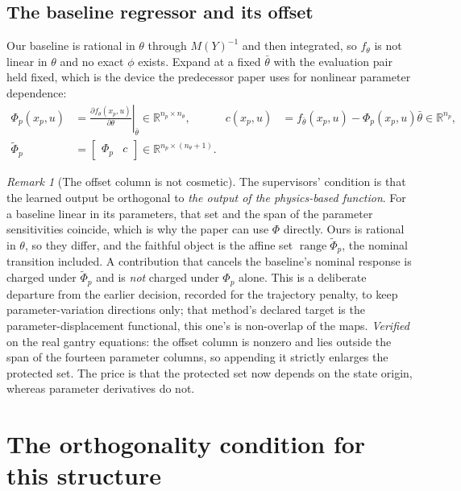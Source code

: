 \documentclass[11pt,a4paper]{article}
\newcommand{\R}{\mathbb R}
\newcommand{\ran}{\operatorname{range}}
\theoremstyle{remark}
\newtheorem{remark}[proposition]{Remark}
\begin{document}
\subsection{The baseline regressor and its offset}

Our baseline is rational in $\theta$ through $M(Y)^{-1}$ and then integrated, so $f_\theta$ is not
linear in $\theta$ and no exact $\phi$ exists. Expand at a fixed $\bar\theta$ with the evaluation
pair held fixed, which is the device the predecessor paper uses for nonlinear parameter dependence:
\begin{align}
 \Phi_p(x_p,u)&=\left.\frac{\partial f_\theta(x_p,u)}{\partial\theta}\right|_{\bar\theta}
   \in\R^{n_p\times n_\theta},
 &c(x_p,u)&=f_{\bar\theta}(x_p,u)-\Phi_p(x_p,u)\bar\theta\in\R^{n_p},\label{eq:taylor}\\
 \widetilde\Phi_p&=\begin{bmatrix}\Phi_p&c\end{bmatrix}\in\R^{n_p\times(n_\theta+1)}.
 &&\label{eq:extreg}
\end{align}

\begin{remark}[The offset column is not cosmetic]\label{rem:offset}
The supervisors' condition is that the learned output be orthogonal to \emph{the output of the
physics-based function}. For a baseline linear in its parameters, that set and the span of the
parameter sensitivities coincide, which is why the paper can use $\Phi$ directly. Ours is rational
in $\theta$, so they differ, and the faithful object is the affine set
$\ran\widetilde\Phi_p$, the nominal transition included. A contribution that cancels the
baseline's nominal response is charged under $\widetilde\Phi_p$ and is \emph{not} charged under
$\Phi_p$ alone. This is a deliberate departure from the earlier decision, recorded for the
trajectory penalty, to keep parameter-variation directions only; that method's declared target is
the parameter-displacement functional, this one's is non-overlap of the maps. \emph{Verified} on
the real gantry equations: the offset column is nonzero and lies outside the span of the fourteen
parameter columns, so appending it strictly enlarges the protected set. The price is that the
protected set now depends on the state origin, whereas parameter derivatives do not.
\end{remark}

\section{The orthogonality condition for this structure}\label{sec:condition}
\end{document}
